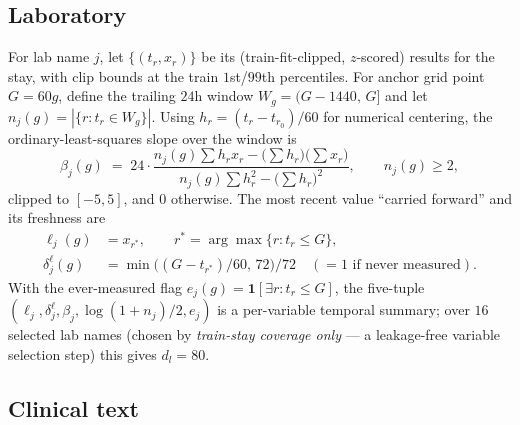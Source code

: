 \documentclass[11pt]{article}
\newcommand{\1}[1]{\mathbf{1}\!\left[#1\right]}
\begin{document}
\subsection{Laboratory}

For lab name $j$, let $\{(t_r,x_r)\}$ be its (train-fit-clipped, $z$-scored) results for the stay, with clip bounds at the train $1$st/$99$th percentiles. For anchor grid point $G=60g$, define the trailing $24$h window $W_g=(G-1440,\,G]$ and let $n_j(g) = |\{r : t_r \in W_g\}|$. Using $h_r = (t_r-t_{r_0})/60$ for numerical centering, the ordinary-least-squares slope over the window is
\begin{equation}
\beta_j(g) \;=\; 24 \cdot \frac{n_j(g)\sum h_r x_r - \big(\sum h_r\big)\big(\sum x_r\big)}{n_j(g)\sum h_r^2 - \big(\sum h_r\big)^2}, \qquad n_j(g)\ge2,
\end{equation}
clipped to $[-5,5]$, and $0$ otherwise. The most recent value ``carried forward'' and its freshness are
\begin{align}
\ell_j(g) &= x_{r^\ast}, \qquad r^\ast = \arg\max\{r : t_r \le G\}, \\
\delta^{\ell}_j(g) &= \min\big((G-t_{r^\ast})/60,\,72\big)/72 \quad (=1 \text{ if never measured}).
\end{align}
With the ever-measured flag $e_j(g)=\1{\exists r: t_r\le G}$, the five-tuple $(\ell_j,\delta^\ell_j,\beta_j,\log(1+n_j)/2,e_j)$ is a per-variable temporal summary; over $16$ selected lab names (chosen by \emph{train-stay coverage only} — a leakage-free variable selection step) this gives $d_l = 80$.

\subsection{Clinical text}
\end{document}
